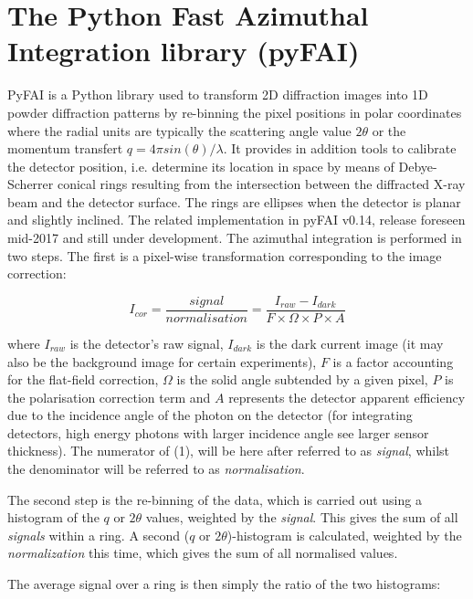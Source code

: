 \documentclass[preprint, pdf]{iucr}              %
\begin{document}
\section{The Python Fast Azimuthal Integration library (pyFAI)}

PyFAI is a Python \cite{python} library used to transform 2D diffraction images into
1D powder diffraction patterns by re-binning the pixel positions in polar
coordinates where the radial units are typically the scattering angle value 
$2\theta$ or the momentum transfert $q=4\pi sin(\theta)/\lambda$.
It provides in addition tools to calibrate the detector position, i.e. determine
its location in space by means of Debye-Scherrer conical rings resulting from
the intersection between the diffracted X-ray beam and the detector
surface. The rings are ellipses when the detector is planar and slightly
inclined.
The related implementation in pyFAI v0.14, release foreseen mid-2017 and still
under development. 
The azimuthal integration is performed in two steps. 
The first is a pixel-wise
transformation corresponding to the image correction:

\begin{equation}
I_{cor} = \frac{signal}{normalisation}  = \frac{I_{raw} - I_{dark}}{F \times
\Omega \times P \times A } 
\end{equation}

where $I_{raw}$ is the detector's raw signal, $I_{dark}$ is the dark current
image (it may also be the background image for certain experiments), $F$ is a 
factor accounting for the flat-field correction, $\Omega$ is the solid
angle subtended by a given pixel, $P$ is the polarisation correction term
and $A$ represents the detector apparent efficiency due to the incidence angle
of the photon on the detector (for integrating detectors, high energy
photons with larger incidence angle see larger sensor thickness).
The numerator of (1), will be here after referred to as
\textit{signal}, whilst the denominator will be referred to as
\textit{normalisation}.

The second step is the re-binning of the data, which is carried out 
using a histogram of the $q$ or $2\theta$ values, weighted by the
\textit{signal}.
This gives the sum of all \textit{signals} within a ring.
A second ($q$ or $2\theta$)-histogram is calculated, weighted
by the \textit{normalization} this time, which gives the sum of all
normalised values.

The average signal over a ring is then simply the ratio of the two histograms:
\end{document}
